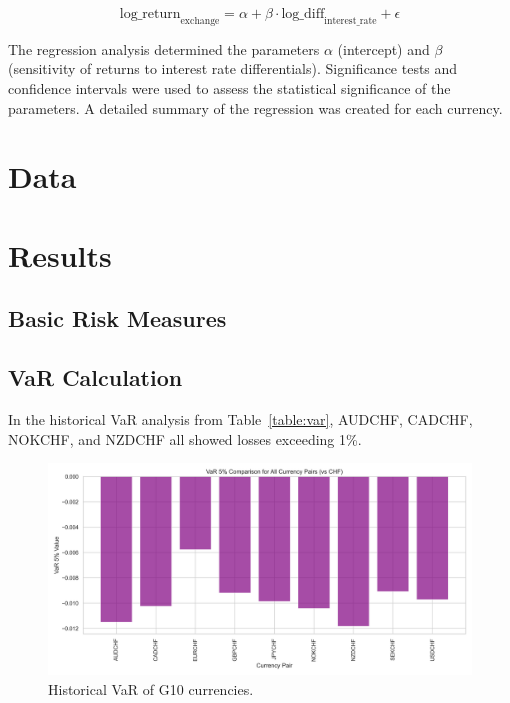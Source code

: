 \documentclass{article}
\begin{document}
\[
\text{log\_return}_{\text{exchange}} = \alpha + \beta \cdot \text{log\_diff}_{\text{interest\_rate}} + \epsilon
\]

The regression analysis determined the parameters \(\alpha\) (intercept) and \(\beta\) (sensitivity of returns to interest rate differentials). Significance tests and confidence intervals were used to assess the statistical significance of the parameters. A detailed summary of the regression was created for each currency.

\section{Data}


\section{Results}
\subsection{Basic Risk Measures}

\subsection{VaR Calculation}
In the historical VaR analysis from Table~\ref{table:var}, AUDCHF, CADCHF, NOKCHF, and NZDCHF all showed losses exceeding 1\%. 

\begin{figure}[h]
    \centering
    \includegraphics[width=0.75\linewidth]{reports/figures/var_5_percent_comparison_plot.png}
    \caption{Historical VaR of G10 currencies.}
    \label{fig:enter-label}
\end{figure}
\end{document}
